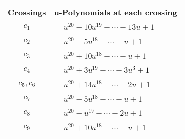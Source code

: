 \documentclass[1p]{elsarticle_modified}
\theoremstyle{definition}
\begin{document}
\begin{tabular}{m{50pt}|m{274pt}}
Crossings & \hspace{64pt}u-Polynomials at each crossing \\
\hline $$\begin{aligned}c_{1}\end{aligned}$$&$\begin{aligned}
&u^{20}-10 u^{19}+\cdots-13 u+1
\end{aligned}$\\
\hline $$\begin{aligned}c_{2}\end{aligned}$$&$\begin{aligned}
&u^{20}-5 u^{18}+\cdots+u+1
\end{aligned}$\\
\hline $$\begin{aligned}c_{3}\end{aligned}$$&$\begin{aligned}
&u^{20}+10 u^{18}+\cdots+u+1
\end{aligned}$\\
\hline $$\begin{aligned}c_{4}\end{aligned}$$&$\begin{aligned}
&u^{20}+3 u^{19}+\cdots-3 u^3+1
\end{aligned}$\\
\hline $$\begin{aligned}c_{5},c_{6}\end{aligned}$$&$\begin{aligned}
&u^{20}+14 u^{18}+\cdots+2 u+1
\end{aligned}$\\
\hline $$\begin{aligned}c_{7}\end{aligned}$$&$\begin{aligned}
&u^{20}-5 u^{18}+\cdots- u+1
\end{aligned}$\\
\hline $$\begin{aligned}c_{8}\end{aligned}$$&$\begin{aligned}
&u^{20}- u^{19}+\cdots-2 u+1
\end{aligned}$\\
\hline $$\begin{aligned}c_{9}\end{aligned}$$&$\begin{aligned}
&u^{20}+10 u^{18}+\cdots- u+1
\end{aligned}$\\

\end{tabular}
\end{document}
